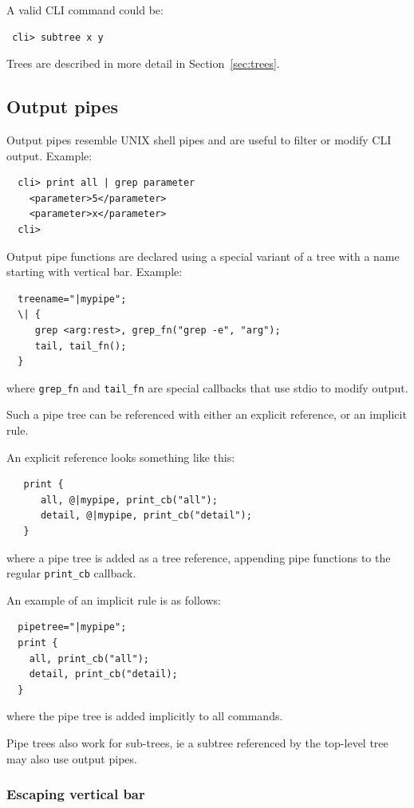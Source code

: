 \documentclass[a4paper, 10pt] {article}
\begin{document}
A valid CLI command could be:
\begin{verbatim}
 cli> subtree x y
\end{verbatim}

Trees are described in more detail in Section~\ref{sec:trees}.

\subsection{Output pipes}
\label{sec:pipes}

Output pipes resemble UNIX shell pipes and are useful to filter or modify CLI output. Example:
\begin{verbatim}
  cli> print all | grep parameter
    <parameter>5</parameter>
    <parameter>x</parameter>
  cli>
\end{verbatim}

Output pipe functions are declared using a special variant of a tree
with a name starting with vertical bar. Example:
\begin{verbatim}
  treename="|mypipe";
  \| { 
     grep <arg:rest>, grep_fn("grep -e", "arg");
     tail, tail_fn();
  }
\end{verbatim}
where {\tt grep\_fn} and {\tt tail\_fn} are special callbacks that use stdio to modify output.

Such a pipe tree can be referenced with either an explicit reference, or an implicit rule.

An explicit reference looks something like this:
\begin{verbatim}
   print {     
      all, @|mypipe, print_cb("all");
      detail, @|mypipe, print_cb("detail");
   }
\end{verbatim}
where a pipe tree is added as a tree reference, appending pipe functions to the regular {\tt print\_cb} callback.

An example of an implicit rule is as follows:
\begin{verbatim}
  pipetree="|mypipe";
  print {
    all, print_cb("all");
    detail, print_cb("detail);
  }
\end{verbatim}
where the pipe tree is added implicitly to all commands.

Pipe trees also work for sub-trees, ie a subtree referenced by the top-level tree may also use output pipes.

\subsubsection{Escaping vertical bar}
\end{document}
